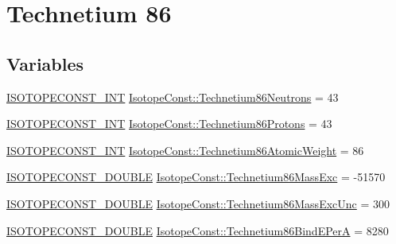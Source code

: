 \hypertarget{group___isotope_const-_technetium-_tc86}{}\section{Technetium 86}
\label{group___isotope_const-_technetium-_tc86}
\subsection*{Variables}
\begin{DoxyCompactItemize}
\item 
\mbox{\hyperlink{group___isotope_const-_macros_ga5f18360b3e99483a35c32d789e62621c}{I\+S\+O\+T\+O\+P\+E\+C\+O\+N\+S\+T\+\_\+\+I\+NT}} \mbox{\hyperlink{group___isotope_const-_technetium-_tc86_ga3d2ca57cf614d3f9e0380f6ca72da209}{Isotope\+Const\+::\+Technetium86\+Neutrons}} = 43
\item 
\mbox{\hyperlink{group___isotope_const-_macros_ga5f18360b3e99483a35c32d789e62621c}{I\+S\+O\+T\+O\+P\+E\+C\+O\+N\+S\+T\+\_\+\+I\+NT}} \mbox{\hyperlink{group___isotope_const-_technetium-_tc86_ga79834892ed66cc354290f5a6928620fc}{Isotope\+Const\+::\+Technetium86\+Protons}} = 43
\item 
\mbox{\hyperlink{group___isotope_const-_macros_ga5f18360b3e99483a35c32d789e62621c}{I\+S\+O\+T\+O\+P\+E\+C\+O\+N\+S\+T\+\_\+\+I\+NT}} \mbox{\hyperlink{group___isotope_const-_technetium-_tc86_gad13b4926c95a39ab90b65ead2f98da53}{Isotope\+Const\+::\+Technetium86\+Atomic\+Weight}} = 86
\item 
\mbox{\hyperlink{group___isotope_const-_macros_ga8f45a7272ce02c0b4c65c44636ed719a}{I\+S\+O\+T\+O\+P\+E\+C\+O\+N\+S\+T\+\_\+\+D\+O\+U\+B\+LE}} \mbox{\hyperlink{group___isotope_const-_technetium-_tc86_gad5c389dee7cd313a925cd682a673c6d1}{Isotope\+Const\+::\+Technetium86\+Mass\+Exc}} = -\/51570
\item 
\mbox{\hyperlink{group___isotope_const-_macros_ga8f45a7272ce02c0b4c65c44636ed719a}{I\+S\+O\+T\+O\+P\+E\+C\+O\+N\+S\+T\+\_\+\+D\+O\+U\+B\+LE}} \mbox{\hyperlink{group___isotope_const-_technetium-_tc86_ga4f744dda40f4e6fe2ed035be33e9e68e}{Isotope\+Const\+::\+Technetium86\+Mass\+Exc\+Unc}} = 300
\item 
\mbox{\hyperlink{group___isotope_const-_macros_ga8f45a7272ce02c0b4c65c44636ed719a}{I\+S\+O\+T\+O\+P\+E\+C\+O\+N\+S\+T\+\_\+\+D\+O\+U\+B\+LE}} \mbox{\hyperlink{group___isotope_const-_technetium-_tc86_ga3fb283224aaffb0043baed8102f973c0}{Isotope\+Const\+::\+Technetium86\+Bind\+E\+PerA}} = 8280
\item 

\end{DoxyCompactItemize}
